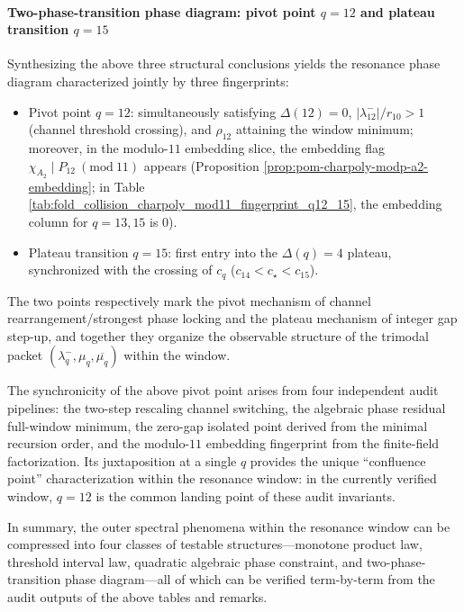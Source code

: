 \begin{remark}
\paragraph{Two-phase-transition phase diagram: pivot point \(q=12\) and plateau transition \(q=15\)}
Synthesizing the above three structural conclusions yields the resonance phase diagram characterized jointly by three fingerprints:
\begin{itemize}
\item Pivot point \(q=12\): simultaneously satisfying \(\Delta(12)=0\), \(|\lambda_{12}^-|/r_{10}>1\) (channel threshold crossing), and \(\rho_{12}\) attaining the window minimum; moreover, in the modulo-\(11\) embedding slice, the embedding flag \(\chi_{A_2}\mid P_{12}\ (\mathrm{mod}\ 11)\) appears (Proposition \ref{prop:pom-charpoly-modp-a2-embedding}; in Table \ref{tab:fold_collision_charpoly_mod11_fingerprint_q12_15}, the embedding column for \(q=13,15\) is \(0\)).
\item Plateau transition \(q=15\): first entry into the \(\Delta(q)=4\) plateau, synchronized with the crossing of \(c_q\) (\(c_{14}<c_\star<c_{15}\)).
\end{itemize}
The two points respectively mark the pivot mechanism of channel rearrangement/strongest phase locking and the plateau mechanism of integer gap step-up, and together they organize the observable structure of the trimodal packet \((\lambda_q^-,\mu_q,\overline{\mu_q})\) within the window.
\par
The synchronicity of the above pivot point arises from four independent audit pipelines: the two-step rescaling channel switching, the algebraic phase residual full-window minimum, the zero-gap isolated point derived from the minimal recursion order, and the modulo-\(11\) embedding fingerprint from the finite-field factorization.
Its juxtaposition at a single \(q\) provides the unique ``confluence point'' characterization within the resonance window: in the currently verified window, \(q=12\) is the common landing point of these audit invariants.
\par
In summary, the outer spectral phenomena within the resonance window can be compressed into four classes of testable structures---monotone product law, threshold interval law, quadratic algebraic phase constraint, and two-phase-transition phase diagram---all of which can be verified term-by-term from the audit outputs of the above tables and remarks.
\end{remark}

